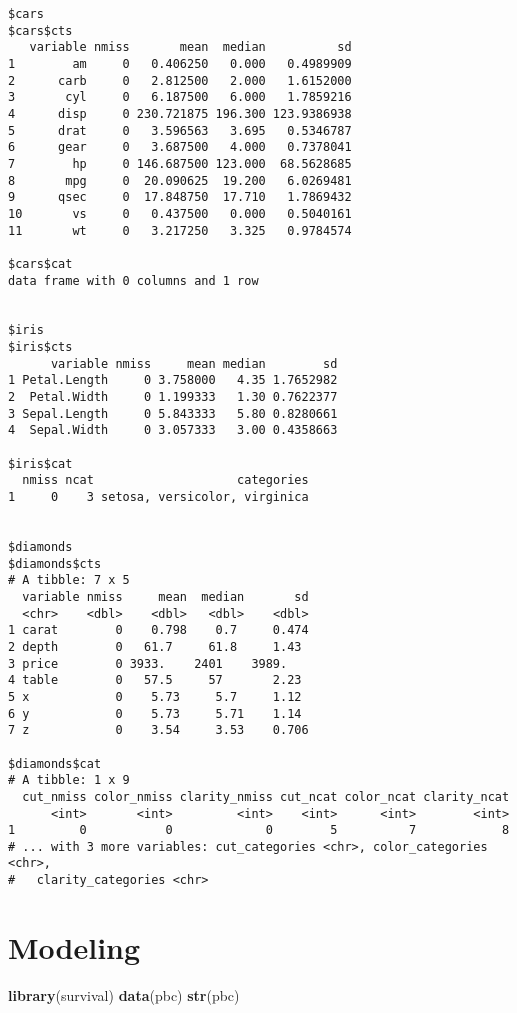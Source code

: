 \documentclass[12pt,letterpaperpaper,openany]{book}
\newenvironment{Shaded}{\begin{snugshade}}{\end{snugshade}}
\newcommand{\KeywordTok}[1]{\textcolor[rgb]{0.13,0.29,0.53}{\textbf{#1}}}
\newcommand{\NormalTok}[1]{#1}
\begin{document}
\begin{verbatim}
$cars
$cars$cts
   variable nmiss       mean  median          sd
1        am     0   0.406250   0.000   0.4989909
2      carb     0   2.812500   2.000   1.6152000
3       cyl     0   6.187500   6.000   1.7859216
4      disp     0 230.721875 196.300 123.9386938
5      drat     0   3.596563   3.695   0.5346787
6      gear     0   3.687500   4.000   0.7378041
7        hp     0 146.687500 123.000  68.5628685
8       mpg     0  20.090625  19.200   6.0269481
9      qsec     0  17.848750  17.710   1.7869432
10       vs     0   0.437500   0.000   0.5040161
11       wt     0   3.217250   3.325   0.9784574

$cars$cat
data frame with 0 columns and 1 row


$iris
$iris$cts
      variable nmiss     mean median        sd
1 Petal.Length     0 3.758000   4.35 1.7652982
2  Petal.Width     0 1.199333   1.30 0.7622377
3 Sepal.Length     0 5.843333   5.80 0.8280661
4  Sepal.Width     0 3.057333   3.00 0.4358663

$iris$cat
  nmiss ncat                    categories
1     0    3 setosa, versicolor, virginica


$diamonds
$diamonds$cts
# A tibble: 7 x 5
  variable nmiss     mean  median       sd
  <chr>    <dbl>    <dbl>   <dbl>    <dbl>
1 carat        0    0.798    0.7     0.474
2 depth        0   61.7     61.8     1.43 
3 price        0 3933.    2401    3989.   
4 table        0   57.5     57       2.23 
5 x            0    5.73     5.7     1.12 
6 y            0    5.73     5.71    1.14 
7 z            0    3.54     3.53    0.706

$diamonds$cat
# A tibble: 1 x 9
  cut_nmiss color_nmiss clarity_nmiss cut_ncat color_ncat clarity_ncat
      <int>       <int>         <int>    <int>      <int>        <int>
1         0           0             0        5          7            8
# ... with 3 more variables: cut_categories <chr>, color_categories <chr>,
#   clarity_categories <chr>
\end{verbatim}

\hypertarget{modeling}{%
\chapter{Modeling}\label{modeling}}

\begin{Shaded}
\begin{Highlighting}[]
\KeywordTok{library}\NormalTok{(survival)}
\KeywordTok{data}\NormalTok{(pbc)}
\KeywordTok{str}\NormalTok{(pbc)}
\end{Highlighting}
\end{Shaded}
\end{document}
